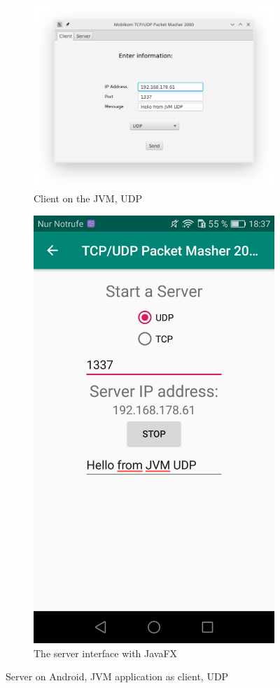 \begin{figure}[H]
	\centering
	\begin{subfigure}{.49\textwidth}
		\centering
		\includegraphics[width=1\linewidth]{images/task3/subtask2/clientUDPNEW.png}
		\caption{Client on the JVM, UDP}
	\end{subfigure}
	\begin{subfigure}{.49\textwidth}
		\centering
		\includegraphics[width=0.74\linewidth]{images/task3/subtask2/android/serverUDP.png}
		\caption{The server interface with JavaFX}
	\end{subfigure}%
	\caption{Server on Android, JVM application as client, UDP}
	\label{fig:androidServerUDP}
\end{figure}

